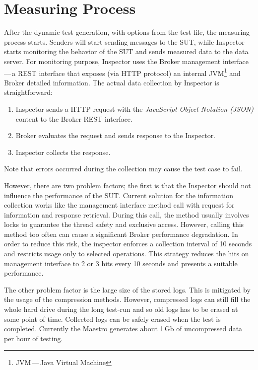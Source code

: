 \section{Measuring Process}
\label{Measuring Process}
After the dynamic test generation, with options from the test file, the measuring process starts. Senders will start sending messages to the SUT, while Inspector starts monitoring the behavior of the SUT and sends measured data to the data server. For monitoring purpose, Inspector uses the Broker management interface\,---\,a REST interface that exposes (via HTTP protocol) an internal JVM\footnote{JVM\,---\,Java Virtual Machine} and Broker detailed information. The actual data collection by Inspector is straightforward:

\begin{enumerate}
	\setlength\itemsep{0em}
	\item Inspector sends a HTTP request with the \emph{JavaScript Object Notation\footnotemark{} (JSON)} content to the Broker REST interface.
	\item Broker evaluates the request and sends response to the Inspector.
	\item Inspector collects the response.
\end{enumerate}
Note that errors occurred during the collection may cause the test case to fail.


However, there are two problem factors; the first is that the Inspector should not influence the performance of the SUT. Current solution for the information collection works like the management interface method call with request for information and response retrieval. During this call, the method usually involves locks to guarantee the thread safety and exclusive access. However, calling this method too often can cause a significant Broker performance degradation. In order to reduce this risk, the inspector enforces a collection interval of 10 seconds and restricts usage only to selected operations. This strategy reduces the hits on management interface to 2 or 3 hits every 10 seconds and presents a suitable performance.

The other problem factor is the large size of the stored logs. This is mitigated by the usage of the compression methods. However, compressed logs can still fill the whole hard drive during the long test-run and so old logs has to be erased at some point of time. Collected logs can be safely erased when the test is completed. Currently the Maestro generates about 1\,Gb of uncompressed data per hour of testing.

